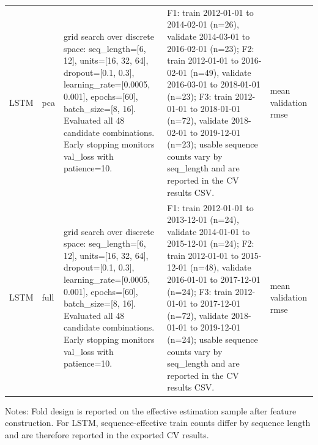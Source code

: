 \begin{table}[htbp]
\begin{tabular}{llp{5.8cm}p{5.6cm}p{2.7cm}}
LSTM & pca & grid search over discrete space: seq\_length=[6, 12], units=[16, 32, 64], dropout=[0.1, 0.3], learning\_rate=[0.0005, 0.001], epochs=[60], batch\_size=[8, 16]. Evaluated all 48 candidate combinations. Early stopping monitors val\_loss with patience=10. & F1: train 2012-01-01 to 2014-02-01 (n=26), validate 2014-03-01 to 2016-02-01 (n=23); F2: train 2012-01-01 to 2016-02-01 (n=49), validate 2016-03-01 to 2018-01-01 (n=23); F3: train 2012-01-01 to 2018-01-01 (n=72), validate 2018-02-01 to 2019-12-01 (n=23); usable sequence counts vary by seq\_length and are reported in the CV results CSV. & mean validation rmse \\
LSTM & full & grid search over discrete space: seq\_length=[6, 12], units=[16, 32, 64], dropout=[0.1, 0.3], learning\_rate=[0.0005, 0.001], epochs=[60], batch\_size=[8, 16]. Evaluated all 48 candidate combinations. Early stopping monitors val\_loss with patience=10. & F1: train 2012-01-01 to 2013-12-01 (n=24), validate 2014-01-01 to 2015-12-01 (n=24); F2: train 2012-01-01 to 2015-12-01 (n=48), validate 2016-01-01 to 2017-12-01 (n=24); F3: train 2012-01-01 to 2017-12-01 (n=72), validate 2018-01-01 to 2019-12-01 (n=24); usable sequence counts vary by seq\_length and are reported in the CV results CSV. & mean validation rmse \\
\bottomrule
\end{tabular}
\begin{tablenotes}
\footnotesize
\item Notes: Fold design is reported on the effective estimation sample after feature construction. 
For LSTM, sequence-effective train counts differ by sequence length and are therefore reported in the exported CV results.
\end{tablenotes}
\end{table}